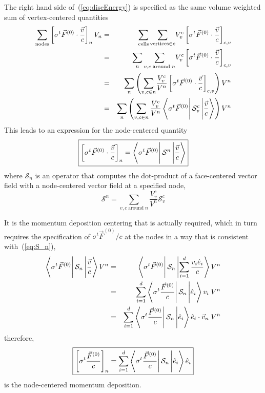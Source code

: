 \documentclass{article}
\newcommand{\bracket}[3]{%
  \ensuremath{%
       \left\langle {#1} \rule{0mm}{4ex} \right|%
       {#2} \left| {#3}  \rule{0mm}{4ex} \right\rangle%
  }%
}
\begin{document}
The right hand side of~(\ref{eq:discEnergy}) is specified as 
the same
volume weighted sum of vertex-centered quantities
\begin{eqnarray}
\sum_{\text{nodes}}
      \left[ \sigma^{t} \vec{F}^{(0)} \cdot \frac{\vec{v}}{c} \right]_{n} V_{n}
  &=& \sum_{\text{cells}} 
      \sum_{\text{vertices} \in c} \! V^{c}_{v}
       \left[ \sigma^{t} \vec{F}^{(0)} \cdot \frac{\vec{v}}{c}
        \right]_{c,v} \\
  &=& \sum_{n} 
      \sum_{v,c \;\text{around}\; n} \! V^{c}_{v}
       \left[ \sigma^{t} \vec{F}^{(0)} \cdot \frac{\vec{v}}{c}
        \right]_{c,v} \\
  &=& \sum_{n} \left( 
      \sum_{v,c \in n} \! \frac{V^{c}_{v}}{V^{n}}
       \left[ \sigma^{t} \vec{F}^{(0)} \cdot \frac{\vec{v}}{c}
        \right]_{c,v} \right) V^{n} \\
  &=& \sum_{n} \left( \sum_{ v,c \in n} \frac{V^{c}_{v}}{V^{n}}
        \bracket{\sigma^{t} \vec{F}^{(0)}}
                {\mathcal{S}^{c}_{v}}{\frac{\vec{v}}{c}} \right) V^{n}
\end{eqnarray}
This leads to an expression for the node-centered quantity
\begin{equation}
\boxed{
  \left[ \sigma^{t} \vec{F}^{(0)} \cdot \frac{\vec{v}}{c} \right]_{n}
    = \bracket{\sigma^{t} \vec{F}^{(0)}}{\mathcal{S}^{n}}{\frac{\vec{v}}{c}}
}
\end{equation}
where $\mathcal{S}_{n}$ is an operator that computes the dot-product
of a face-centered vector field with a node-centered vector field at
a specified node,
\begin{equation}
 \boxed{
   \mathcal{S}^{n} = \sum_{ v,c \; \text{around} \; n}
                        \frac{V^{c}_{v}}{V^{n}}\mathcal{S}^{c}_{v}
 }
\label{eq:S_n}
\end{equation}

It is the momentum deposition centering that
is actually required, which in turn requires
the specification of $\sigma^{t} \vec{F}^{(0)} / c$ at the nodes in
a way that
is consistent with~(\ref{eq:S_n}),
\begin{eqnarray}
   \bracket{\sigma^{t} \vec{F}^{(0)}}
                       {\mathcal{S}_{n}}
                       {\frac{\vec{v}}{c}} V^{n}
  &=&  \bracket{\sigma^{t} \vec{F}^{(0)}}
                       {\mathcal{S}_{n}}
                       {\sum_{i=1}^{d} \frac{v_{i}\hat{e}_{i}}{c}} V^{n}
   \\
  &=&  \sum_{i=1}^{d} \bracket{\sigma^{t} \frac{\vec{F}^{(0)}}{c}}
                       {\mathcal{S}_{n}}
                       {\hat{e}_{i}}v_{i} \; V^{n}
   \\
  &=&  \sum_{i=1}^{d} \bracket{\sigma^{t} \frac{\vec{F}^{(0)}}{c}}
                       {\mathcal{S}_{n}}
                       {\hat{e}_{i}} \hat{e}_{i} \cdot \vec{v}_{n}
                         \; V^{n}
\end{eqnarray}
therefore,
\begin{equation}
 \boxed{
\left[ \sigma^{t} \frac{\vec{F}^{(0)}}{c} \right]_{n}
    = \sum_{i=1}^{d} \bracket{\sigma^{t} \frac{\vec{F}^{(0)}}{c}}
                       {\mathcal{S}_{n}}
                       {\hat{e}_{i}} \hat{e}_{i}
}
\end{equation}
is the node-centered momentum deposition.
\end{document}
